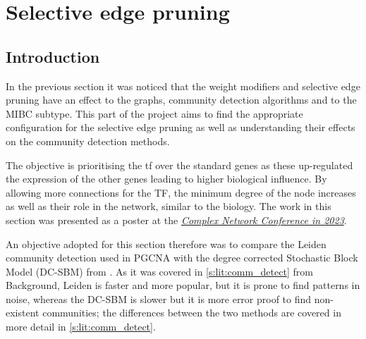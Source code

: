\chapter{Selective edge pruning} \label{s:N_I:sel_pruning}
\vspace{3mm}
\vspace{3mm}

\section{Introduction}

In the previous section it was noticed that the weight modifiers and selective edge pruning have an effect to the graphs, community detection algorithms and to the MIBC subtype. This part of the project aims to find the appropriate configuration for the selective edge pruning as well as understanding their effects on the community detection methods. 

The objective is prioritising the \acrfull{tf} over the standard genes as these up-regulated the expression of the other genes leading to higher biological influence. By allowing more connections for the TF, the minimum degree of the node increases as well as their role in the network, similar to the biology. The work in this section was presented as a poster at the \textit{\href{https://2023.complexnetworks.org/}{Complex Network Conference in 2023}}.

An objective adopted for this section therefore was to compare the Leiden \citep{Traag2019-ne} community detection used in PGCNA with the degree corrected Stochastic Block Model (DC-SBM) from \citep{Karrer2011-si, Peixoto2017-gc}. As it was covered in \cref{s:lit:comm_detect} from Background, Leiden is faster and more popular, but it is prone to find patterns in noise, whereas the DC-SBM is slower but it is more error proof to find non-existent communities; the differences between the two methods are covered in more detail in \cref{s:lit:comm_detect}. 

